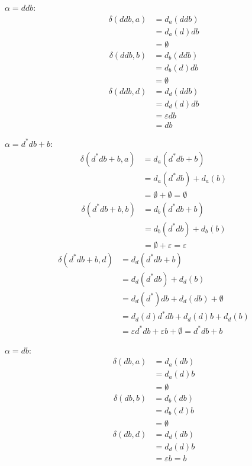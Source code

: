 \medspace $\alpha = ddb$:
\begin{align*}
	\delta(ddb, a) &= d_a(ddb) \\
	&= d_a(d)db \\
	&= \emptyset
\end{align*}
\begin{align*}
	\delta(ddb, b) &= d_b(ddb) \\
	&= d_b(d)db \\
	&= \emptyset
\end{align*}
\begin{align*}
	\delta(ddb, d) &= d_d(ddb) \\
	&= d_d(d)db\\
	&= \varepsilon db \\
	&= db
\end{align*}

\medspace $\alpha = d^*db + b$:
\begin{align*}
	\delta(d^*db + b, a) &= d_a(d^*db + b) \\
	&= d_a(d^*db) + d_a(b) \\
	&= \emptyset + \emptyset = \emptyset
\end{align*}
\begin{align*}
	\delta(d^*db + b, b) &= d_b(d^*db + b) \\
	&= d_b(d^*db) + d_b(b) \\
	&= \emptyset + \varepsilon = \varepsilon
\end{align*}
\begin{align*}
	\delta(d^*db + b, d) &= d_d(d^*db + b) \\
	&= d_d(d^*db) + d_d(b) \\
	&= d_d(d^*)db + d_d(db) + \emptyset \\
	&= d_d(d)d^*db + d_d(d)b + d_d(b) \\
	&= \varepsilon d^*db + \varepsilon b + \emptyset = d^*db + b
\end{align*}

\medspace $\alpha = db$:
\begin{align*}
	\delta(db, a) &= d_a(db) \\
	&= d_a(d)b \\
	&= \emptyset
\end{align*}
\begin{align*}
	\delta(db, b) &= d_b(db) \\
	&= d_b(d)b \\
	&= \emptyset
\end{align*}
\begin{align*}
	\delta(db, d) &= d_d(db) \\
	&= d_d(d)b \\
	&= \varepsilon b = b
\end{align*}

